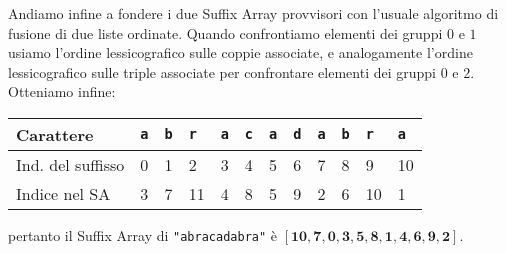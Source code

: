 Andiamo infine a fondere i due Suffix Array provvisori con l'usuale algoritmo di
fusione di due liste ordinate. Quando confrontiamo elementi dei gruppi \(0\) e 
\(1\) usiamo l'ordine lessicografico sulle coppie associate, e analogamente 
l'ordine lessicografico sulle triple associate per confrontare elementi dei gruppi
\(0\) e \(2\). Otteniamo infine:
\begin{table}[H]
  \begin{tabularx}{\linewidth}{l*{11}{X}}
    Carattere              & \texttt{a} & \texttt{b} & \texttt{r} & \texttt{a}
                           & \texttt{c} & \texttt{a} & \texttt{d} & \texttt{a}
                           & \texttt{b} & \texttt{r} & \texttt{a} \\
    \hline
    Ind. del suffisso      & 0 & 1 & 2 & 3
                           & 4 & 5 & 6 & 7
                           & 8 & 9 & 10 \\
    Indice nel SA          & 3 & 7 & 11 & 4
                           & 8 & 5 & 9 & 2
                           & 6 & 10 & 1 \\
  \end{tabularx}
\end{table}
pertanto il Suffix Array di \texttt{\string"abracadabra\string"} \`e 
\([\mathbf{10},\mathbf{7},\mathbf{0},\mathbf{3},\mathbf{5},\mathbf{8},\mathbf{1},
\mathbf{4},\mathbf{6},\mathbf{9},\mathbf{2}]\).
